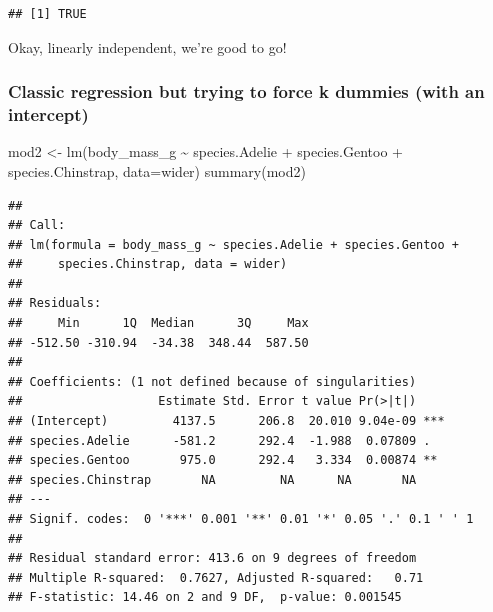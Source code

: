 \documentclass[
  openany]{book}
\newenvironment{Shaded}{\begin{snugshade}}{\end{snugshade}}
\newcommand{\AttributeTok}[1]{\textcolor[rgb]{0.77,0.63,0.00}{#1}}
\newcommand{\FunctionTok}[1]{\textcolor[rgb]{0.00,0.00,0.00}{#1}}
\newcommand{\NormalTok}[1]{#1}
\newcommand{\OtherTok}[1]{\textcolor[rgb]{0.56,0.35,0.01}{#1}}
\newcommand{\SpecialCharTok}[1]{\textcolor[rgb]{0.00,0.00,0.00}{#1}}
\begin{document}
\begin{Shaded}
\end{Shaded}

\begin{verbatim}
## [1] TRUE
\end{verbatim}

Okay, linearly independent, we're good to go!

\hypertarget{classic-regression-but-trying-to-force-k-dummies-with-an-intercept}{%
\subsubsection{Classic regression but trying to force k dummies (with an intercept)}\label{classic-regression-but-trying-to-force-k-dummies-with-an-intercept}}

\begin{Shaded}
\begin{Highlighting}[]
\NormalTok{mod2 }\OtherTok{\textless{}{-}} \FunctionTok{lm}\NormalTok{(body\_mass\_g }\SpecialCharTok{\textasciitilde{}}\NormalTok{ species.Adelie }\SpecialCharTok{+}\NormalTok{ species.Gentoo }\SpecialCharTok{+}\NormalTok{ species.Chinstrap, }\AttributeTok{data=}\NormalTok{wider)}
\FunctionTok{summary}\NormalTok{(mod2)}
\end{Highlighting}
\end{Shaded}

\begin{verbatim}
## 
## Call:
## lm(formula = body_mass_g ~ species.Adelie + species.Gentoo + 
##     species.Chinstrap, data = wider)
## 
## Residuals:
##     Min      1Q  Median      3Q     Max 
## -512.50 -310.94  -34.38  348.44  587.50 
## 
## Coefficients: (1 not defined because of singularities)
##                   Estimate Std. Error t value Pr(>|t|)    
## (Intercept)         4137.5      206.8  20.010 9.04e-09 ***
## species.Adelie      -581.2      292.4  -1.988  0.07809 .  
## species.Gentoo       975.0      292.4   3.334  0.00874 ** 
## species.Chinstrap       NA         NA      NA       NA    
## ---
## Signif. codes:  0 '***' 0.001 '**' 0.01 '*' 0.05 '.' 0.1 ' ' 1
## 
## Residual standard error: 413.6 on 9 degrees of freedom
## Multiple R-squared:  0.7627, Adjusted R-squared:   0.71 
## F-statistic: 14.46 on 2 and 9 DF,  p-value: 0.001545
\end{verbatim}
\end{document}
